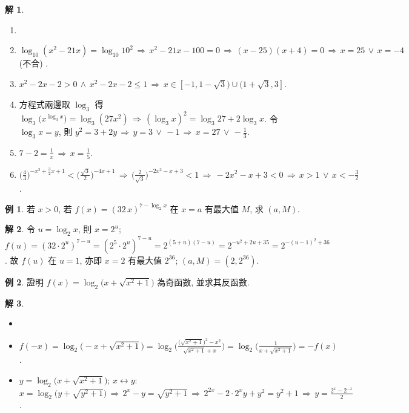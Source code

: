 \documentclass[12pt]{extarticle}
\newcommand{\ds}{\displaystyle}
\newcommand{\ie}{\,\Longrightarrow\,}
\theoremstyle{definition}
\newtheorem*{ex}{例}
\newtheorem*{sol}{解}
\begin{document}
\begin{sol}
  \vspace{-0.5em}
  \begin{enumerate}\setlength\itemsep{0em}
    \item[]
    \item $\ds\log_{10} (x^2 - 21 x) = \log_{10} 10^2 \ie x^2 - 21x - 100 = 0 \ie (x - 25)(x + 4) = 0 \ie x = 25\,\vee\,x = -4$ (不合) . 
    \item $\ds x^2 - 2x - 2 > 0\,\wedge\, x^2 - 2x - 2\leqslant 1 \ie x \in [-1, 1 - \sqrt{3})\cup (1 + \sqrt{3}, 3]$.
    \item 方程式兩邊取 $\ds\log_3$ 得 $\ds\log_3\big(x^{\log_3 x}\big) = \log_3(27 x^2) \ie (\log_3 x)^2 = \log_3 27 + 2\log_3 x$. 令 $\ds\log_3 x = y$, 則 $\ds y^2 = 3 + 2y \ie y = 3\,\vee\,-1 \ie x = 27\,\vee\,-\frac{1}{3}$.
    \item $\ds 7 - 2 = \frac{1}{x} \ie x = \frac{1}{5}$. 
    \item $\ds\Big(\frac{4}{3}\Big)^{-x^2 + \frac{3}{2}x + 1} < \Big(\frac{\sqrt{3}}{2}\Big)^{-4x + 1} \ie \Big(\frac{2}{\sqrt{3}}\Big)^{-2x^2 -x + 3} < 1\ie -2x^2 -x + 3 < 0 \ie x > 1\,\vee\,x < -\frac{3}{2}$. 
  \end{enumerate}
\end{sol}

\begin{ex}
  若 $x > 0$, 若 $\ds f(x) = (32\,x)^{7 - \log_2 x}$ 在 $x = a$ 有最大值 $M$, 求 $(a, M)$. 
\end{ex}

\begin{sol}
  令 $u = \log_2x$, 則 $x = 2^u$; $f(u) = (32\cdot 2^u)^{7 - u} = (2^5\cdot 2^u)^{7 - u} = 2^{(5 + u)(7 - u)} = 2^{-u^2 + 2u + 35} = 2^{-(u - 1)^2 + 36}$. 故 $f(u)$ 在 $u = 1$, 亦即 $x = 2$ 有最大值 $2^{36}$; $(a, M) = (2, 2^{36})$.
\end{sol}

\begin{ex}
  證明 $\ds f(x) = \log_2\big(x + \sqrt{x^2 + 1}\big)$ 為奇函數, 並求其反函數. 
\end{ex}

\begin{sol}
  \vspace{-0.5em}
  \begin{itemize}\setlength\itemsep{0em}
    \item[]
    \item $\ds f(-x) = \log_2\big(-x + \sqrt{x^2 + 1}\big) = \log_2\bigg(\frac{\big(\sqrt{x^2 + 1}\big)^2 - x^2}{\sqrt{x^2 + 1} + x}\bigg) = \log_2\bigg(\frac{1}{x + \sqrt{x^2 + 1}}\bigg) = -f(x)$. 
    \item $\ds y = \log_2\big(x + \sqrt{x^2 + 1}\big)$; $x\longleftrightarrow y$: $\ds x = \log_2\big(y + \sqrt{y^2 + 1}\big)\ie 2^x - y = \sqrt{y^2 + 1} \ie 2^{2x} - 2\cdot2^x y + y^2 = y^2 + 1 \ie y = \frac{2^x - 2^{-x}}{2}$. 
  \end{itemize}
\end{sol}
\end{document}

